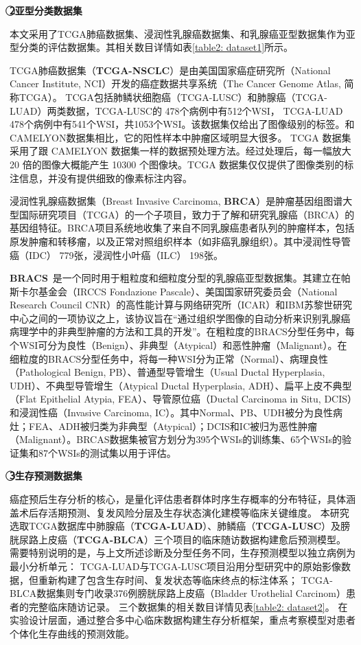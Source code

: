 \textbf{\textcircled{2}亚型分类数据集}

本文采用了TCGA肺癌数据集、浸润性乳腺癌数据集、和乳腺癌亚型数据集作为亚型分类的评估数据集。其相关数目详情如表\ref{table2: dataset1}所示。

TCGA肺癌数据集（\textbf{TCGA-NSCLC}）是由美国国家癌症研究所（National Cancer Institute, NCI）开发的癌症数据共享系统（The Cancer Genome Atlas, 简称TCGA）。
TCGA包括肺鳞状细胞癌（TCGA-LUSC）和肺腺癌（TCGA-LUAD）两类数据，TCGA-LUSC的 478个病例中有512个WSI，
TCGA-LUAD 478个病例中有541个WSI，共1053个WSI。该数据集仅给出了图像级别的标签。和CAMELYON数据集相比，它的阳性样本中肿瘤区域明显大很多。
TCGA 数据集采用了跟 CAMELYON 数据集一样的数据预处理方法。经过处理后，每一幅放大 20 倍的图像大概能产生 10300 个图像块。TCGA 数据集仅仅提供了图像类别的标注信息，并没有提供细致的像素标注内容。

浸润性乳腺癌数据集（Breast Invasive Carcinoma, \textbf{BRCA}）是肿瘤基因组图谱大型国际研究项目（TCGA）的一个子项目，致力于了解和研究乳腺癌（BRCA）的基因组特征。BRCA项目系统地收集了来自不同乳腺癌患者队列的肿瘤样本，包括原发肿瘤和转移瘤，以及正常对照组织样本（如非癌乳腺组织）。其中浸润性导管癌（IDC） 779张，浸润性小叶癌（ILC） 198张。

\textbf{BRACS}~\cite{brancati2022bracs}是一个同时用于粗粒度和细粒度分型的乳腺癌亚型数据集。其建立在帕斯卡尔基金会（IRCCS Fondazione Pascale）、美国国家研究委员会（National Research Council CNR）的高性能计算与网络研究所（ICAR）和IBM苏黎世研究中心之间的一项协议之上，该协议旨在“通过组织学图像的自动分析来识别乳腺癌病理学中的非典型肿瘤的方法和工具的开发”。在粗粒度的BRACS分型任务中，每个WSI可分为良性（Benign）、非典型（Atypical）和恶性肿瘤（Malignant）。在细粒度的BRACS分型任务中，将每一种WSI分为正常（Normal）、病理良性（Pathological Benign, PB）、普通型导管增生（Usual Ductal Hyperplasia, UDH）、不典型导管增生（Atypical Ductal Hyperplasia, ADH）、扁平上皮不典型（Flat Epithelial Atypia, FEA）、导管原位癌（Ductal Carcinoma in Situ, DCIS）和浸润性癌（Invasive Carcinoma, IC）。其中Normal、PB、UDH被分为良性病灶；FEA、ADH被归类为非典型（Atypical）；DCIS和IC被归为恶性肿瘤（Malignant）。BRCAS数据集被官方划分为395个WSIs的训练集、65个WSIs的验证集和87个WSIs的测试集以用于评估。

\textbf{\textcircled{3}生存预测数据集}

癌症预后生存分析的核心，是量化评估患者群体时序生存概率的分布特征，具体涵盖术后存活期预测、复发风险分层及生存状态演化建模等临床关键维度。
本研究选取TCGA数据库中肺腺癌（\textbf{TCGA-LUAD}）、肺鳞癌（\textbf{TCGA-LUSC}）及膀胱尿路上皮癌（\textbf{TCGA-BLCA}）三个项目的临床随访数据构建愈后预测模型。
需要特别说明的是，与上文所述诊断及分型任务不同，生存预测模型以独立病例为最小分析单元：
TCGA-LUAD与TCGA-LUSC项目沿用分型研究中的原始影像数据，但重新构建了包含生存时间、复发状态等临床终点的标注体系；
TCGA-BLCA数据集则专门收录376例膀胱尿路上皮癌（Bladder Urothelial Carcinom）患者的完整临床随访记录。
三个数据集的相关数目详情见表\ref{table2: dataset2}。
在实验设计层面，通过整合多中心临床数据构建生存分析框架，重点考察模型对患者个体化生存曲线的预测效能。

